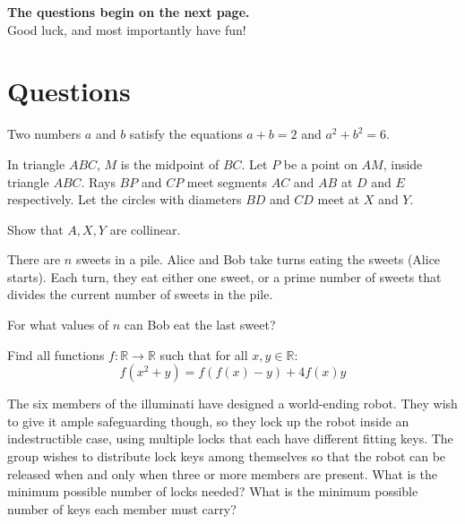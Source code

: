 \documentclass{exam}
\begin{document}
\centering

\textbf{The questions begin on the next page.}\\
\vspace{10pt}
Good luck, and most importantly have fun!



\newpage
\section*{Questions}
\vspace{20pt}

\begin{questions}
    \question
    Two numbers $a$ and $b$ satisfy the equations $a+b=2$ and $a^2+b^2=6$.

    \question
    In triangle $ABC$, $M$ is the midpoint of $BC$. Let $P$ be a point on $AM$, inside triangle $ABC$.
    Rays $BP$ and $CP$ meet segments $AC$ and $AB$ at $D$ and $E$ respectively. Let the circles with diameters $BD$ and $CD$ meet at $X$ and $Y$.

    Show that $A, X, Y$ are collinear.

    \question
    There are $n$ sweets in a pile. Alice and Bob take turns eating the sweets (Alice starts). Each turn, they eat either one sweet, or a prime number of sweets that divides the current number of sweets in the pile.

    For what values of $n$ can Bob eat the last sweet?

    \question
    Find all functions $f : \mathbb{R} \to \mathbb{R}$ such that for all $x, y \in \mathbb{R}$:
    $$f(x^2+y) = f(f(x)-y) + 4f(x)y$$

    \question
    The six members of the illuminati have designed a world-ending robot. They wish to give it ample safeguarding though, so they lock up the robot inside an indestructible case, using multiple locks that each have different fitting keys. The group wishes to distribute lock keys among themselves so that the robot can be released when and only when three or more members are present. What is the minimum possible number of locks needed? What is the minimum possible number of keys each member must carry?


\end{questions}
\end{document}
